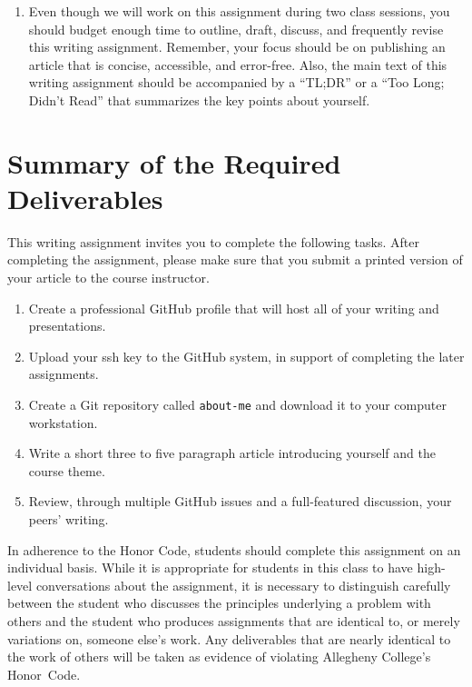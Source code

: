 \begin{enumerate}
  \item Even though we will work on this assignment during two class sessions, you should budget enough time to outline,
    draft, discuss, and frequently revise this writing assignment. Remember, your focus should be on publishing an
    article that is concise, accessible, and error-free. Also, the main text of this writing assignment should be
    accompanied by a ``TL;DR'' or a ``Too Long; Didn't Read'' that summarizes the key points about yourself.

\end{enumerate}

\vspace*{-.05in}
\section*{Summary of the Required Deliverables}

This writing assignment invites you to complete the following tasks. After completing the assignment, please make sure
that you submit a printed version of your article to the course instructor.

\vspace*{-.1in}
\begin{enumerate}
  \setlength{\itemsep}{0in}

  \item Create a professional GitHub profile that will host all of your writing and presentations.
  \item Upload your ssh key to the GitHub system, in support of completing the later assignments.
  \item Create a Git repository called {\tt about-me} and download it to your computer workstation.
  \item Write a short three to five paragraph article introducing yourself and the course theme.
  \item Review, through multiple GitHub issues and a full-featured discussion, your peers' writing.

\end{enumerate}
\vspace*{-.1in}

In adherence to the Honor Code, students should complete this assignment on an individual basis. While it is appropriate
for students in this class to have high-level conversations about the assignment, it is necessary to distinguish
carefully between the student who discusses the principles underlying a problem with others and the student who produces
assignments that are identical to, or merely variations on, someone else's work. Any deliverables that are nearly
identical to the work of others will be taken as evidence of violating Allegheny College's \mbox{Honor Code}.



